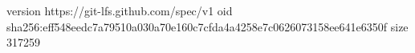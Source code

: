 version https://git-lfs.github.com/spec/v1
oid sha256:eff548eedc7a79510a030a70e160c7cfda4a4258e7c0626073158ee641e6350f
size 317259
